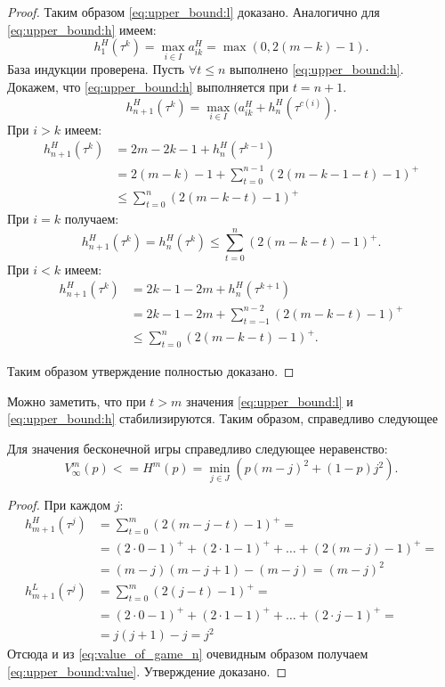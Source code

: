 \begin{proof}
Таким образом \eqref{eq:upper_bound:l} доказано.
Аналогично для \eqref{eq:upper_bound:h} имеем:
\[
  h_1^H(\tau^k) = \max_{i \in I} a_{ik}^H = \max(0, 2(m - k) - 1).
\]
База индукции проверена.
Пусть $ \forall t \leq n $ выполнено \eqref{eq:upper_bound:h}. Докажем, что \eqref{eq:upper_bound:h} выполняется при $ t = n + 1 $.
\[
h_{n+1}^H(\tau^k) = \max_{i \in I}(a_{ik}^H + h_n^H(\tau^{c(i)}).
\]
При $ i > k $ имеем:
\begin{align*}
  h_{n+1}^H(\tau^k) 
  &= 2m - 2k - 1 + h_n^H(\tau^{k-1}) \\
  &= 2(m-k)- 1 + \sum_{t = 0}^{n-1}(2(m-k-1-t)-1)^+ \\
  &\leq \sum_{t = 0}^n (2(m-k-t) - 1)^+
\end{align*}
При $ i = k $ получаем:
\[
  h_{n+1}^H(\tau^k) = h_n^H(\tau^k) \leq \sum_{t=0}^n(2(m-k-t)-1)^+.
\]
При $ i < k $ имеем:
\begin{align*}
  h_{n+1}^H(\tau^k) 
    &= 2k - 1 - 2m + h_n^H(\tau^{k+1}) \\
    &= 2k - 1 - 2m + \sum_{t = -1}^{n-2} (2(m-k-t)-1)^+ \\
    &\leq \sum_{t=0}^n(2(m-k-t)-1)^+.
\end{align*}

Таким образом утверждение полностью доказано.
\end{proof}

Можно заметить, что при $ t > m $ значения \eqref{eq:upper_bound:l} и \eqref{eq:upper_bound:h} стабилизируются. Таким образом, справедливо следующее

\begin{utver}
Для значения бесконечной игры справедливо следующее неравенство:
\begin{equation}
\label{eq:upper_bound:value}
V_\infty^m(p) 
<= 
H^m(p) = \min_{j \in J}
    (p(m-j)^2 + (1-p)j^2).
\end{equation}
\end{utver}
\begin{proof}
При каждом $ j $:
\begin{align*}
h_{m+1}^H(\tau^j) 
&= \sum_{t=0}^m (2(m-j-t)-1)^+ = \\
&= (2 \cdot 0 - 1)^+ + (2 \cdot 1 - 1)^+ + \ldots + (2(m-j) - 1)^+ = \\
&= (m-j)(m-j+1) - (m-j) = (m-j)^2
\\
h_{m+1}^L(\tau^j)
&= \sum_{t=0}^m (2(j-t)-1)^+ = \\
&= (2 \cdot 0 - 1)^+ + (2 \cdot 1 - 1)^+ + \ldots + (2 \cdot j - 1)^+ = \\
&= j(j+1) - j = j^2
\end{align*}
Отсюда и из \eqref{eq:value_of_game_n} очевидным образом получаем \eqref{eq:upper_bound:value}. Утверждение доказано.
\end{proof}

